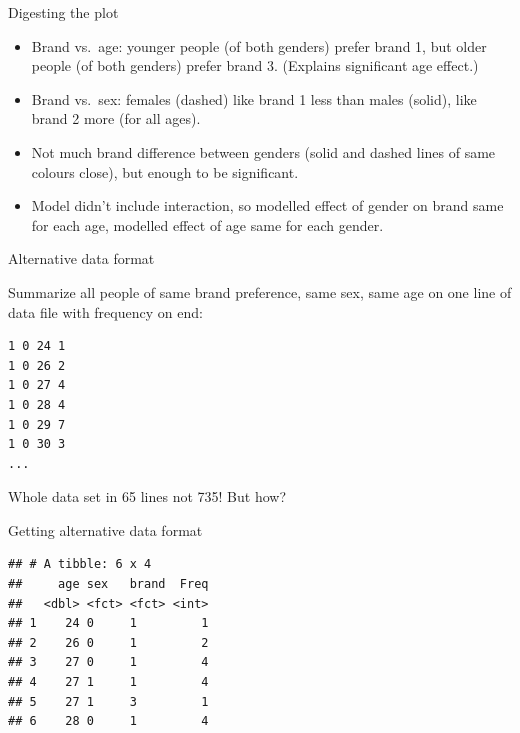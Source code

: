\documentclass[ignorenonframetext,]{beamer}
\newenvironment{Shaded}{\begin{snugshade}}{\end{snugshade}}
\newcommand{\DataTypeTok}[1]{\textcolor[rgb]{0.13,0.29,0.53}{#1}}
\newcommand{\DecValTok}[1]{\textcolor[rgb]{0.00,0.00,0.81}{#1}}
\newcommand{\KeywordTok}[1]{\textcolor[rgb]{0.13,0.29,0.53}{\textbf{#1}}}
\newcommand{\NormalTok}[1]{#1}
\newcommand{\OperatorTok}[1]{\textcolor[rgb]{0.81,0.36,0.00}{\textbf{#1}}}
\newcommand{\StringTok}[1]{\textcolor[rgb]{0.31,0.60,0.02}{#1}}
\begin{document}
\begin{frame}{Digesting the plot}
\protect\hypertarget{digesting-the-plot}{}

\begin{itemize}
\item
  Brand vs.~age: younger people (of both genders) prefer brand 1, but
  older people (of both genders) prefer brand 3. (Explains significant
  age effect.)
\item
  Brand vs.~sex: females (dashed) like brand 1 less than males (solid),
  like brand 2 more (for all ages).
\item
  Not much brand difference between genders (solid and dashed lines of
  same colours close), but enough to be significant.
\item
  Model didn't include interaction, so modelled effect of gender on
  brand same for each age, modelled effect of age same for each gender.
\end{itemize}

\end{frame}

\begin{frame}[fragile]{Alternative data format}
\protect\hypertarget{alternative-data-format}{}

Summarize all people of same brand preference, same sex, same age on one
line of data file with frequency on end:

\begin{verbatim}
1 0 24 1
1 0 26 2
1 0 27 4
1 0 28 4
1 0 29 7
1 0 30 3
...
\end{verbatim}

Whole data set in 65 lines not 735! But how?

\end{frame}

\begin{frame}[fragile]{Getting alternative data format}
\protect\hypertarget{getting-alternative-data-format}{}

\begin{Shaded}
\end{Shaded}

\begin{verbatim}
## # A tibble: 6 x 4
##     age sex   brand  Freq
##   <dbl> <fct> <fct> <int>
## 1    24 0     1         1
## 2    26 0     1         2
## 3    27 0     1         4
## 4    27 1     1         4
## 5    27 1     3         1
## 6    28 0     1         4
\end{verbatim}

\end{frame}
\end{document}
